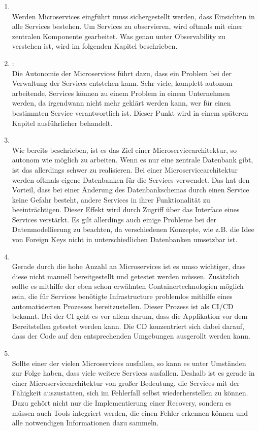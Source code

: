 \begin{definition}
\begin{enumerate}
		\item {}\\
		Werden Microservices eingführt muss sichergestellt werden, dass Einsichten in alle Services bestehen. Um Services zu observieren, wird oftmals mit einer zentralen Komponente gearbeitet. Was genau unter Observability zu verstehen ist, wird im folgenden Kapitel beschrieben.
		\item {}:\\
		Die Autonomie der Microservices führt dazu, dass ein Problem bei der Verwaltung der Services entstehen kann. Sehr viele, komplett autonom arbeitende, Services können zu einem Problem in einem Unternehmen werden, da irgendwann nicht mehr geklärt werden kann, wer für einen bestimmten Service verantwortlich ist. Dieser Punkt wird in einem späteren Kapitel ausführlicher behandelt.
		\item {}\\
		Wie bereits beschrieben, ist es das Ziel einer Microservicearchitektur, so autonom wie möglich zu arbeiten. Wenn es nur eine zentrale Datenbank gibt, ist das allerdings schwer zu realisieren. Bei einer Microservicearchitektur werden oftmals eigene Datenbanken für die Services verwendet. Das hat den Vorteil, dass bei einer Änderung des Datenbankschemas durch einen Service keine Gefahr besteht, andere Services in ihrer Funktionalität zu beeinträchtigen. Dieser Effekt wird durch Zugriff über das Interface eines Services verstärkt. Es gilt allerdings auch einige Probleme bei der Datenmodellierung zu beachten, da verschiedenen Konzepte, wie z.B. die Idee von Foreign Keys nicht in unterschiedlichen Datenbanken umsetzbar ist.
		\item {}\\
		Gerade durch die hohe Anzahl an Microservices ist es umso wichtiger, dass diese nicht manuell bereitgestellt und getestet werden müssen. Zusätzlich sollte es mithilfe der eben schon erwähnten Containertechnologien möglich sein, die für Services benötigte Infrastructure problemlos mithilfe eines automatisierten Prozesses bereitzustellen. Dieser Prozess ist als \ac{CI}/\ac{CD} bekannt. Bei der \ac{CI} geht es vor allem darum, dass die Applikation vor dem Bereitstellen getestet werden kann. Die \ac{CD} konzentriert sich dabei darauf, dass der Code auf den entsprechenden Umgebungen ausgerollt werden kann.
		\item {}\\
		Sollte einer der vielen Microservices ausfallen, so kann es unter Umständen zur Folge haben, dass viele weitere Services ausfallen. Deshalb ist es gerade in einer Microservicearchitektur von großer Bedeutung, die Services mit der Fähigkeit auszustatten, sich im Fehlerfall selbst wiederherstellen zu können. Dazu gehört nicht nur die Implementierung einer Recovery, sondern es müssen auch Tools integriert werden, die einen Fehler erkennen können und alle notwendigen Informationen dazu sammeln.
	\end{enumerate}
\end{definition}


